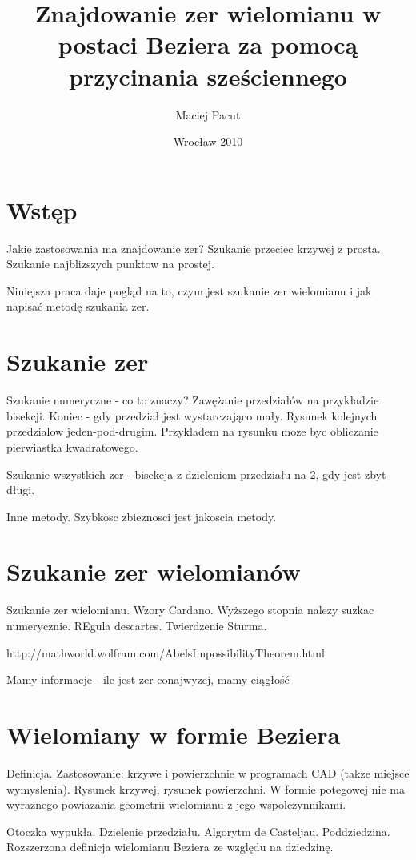 \documentclass[11pt,a4paper,oneside]{report}
\title{Znajdowanie zer wielomianu w postaci Beziera za pomocą przycinania sześciennego}
\author{Maciej Pacut}
\date{Wrocław 2010}
\begin{document}
\maketitle
\newpage

\section{Wstęp}

Jakie zastosowania ma znajdowanie zer? Szukanie przeciec krzywej z prosta. Szukanie najblizszych punktow na prostej.

Niniejsza praca daje pogląd na to, czym jest szukanie zer wielomianu i jak napisać metodę szukania zer.

\section{Szukanie zer}


Szukanie numeryczne - co to znaczy? Zawężanie przedziałów na przykładzie bisekcji. Koniec - gdy przedział jest wystarczająco mały. Rysunek kolejnych przedzialow jeden-pod-drugim. Przykladem na rysunku moze byc obliczanie pierwiastka kwadratowego.

Szukanie wszystkich zer - bisekcja z dzieleniem przedziału na 2, gdy jest zbyt długi.

Inne metody. Szybkosc zbieznosci jest jakoscia metody. 

\section{Szukanie zer wielomianów}

Szukanie zer wielomianu. Wzory Cardano. Wyższego stopnia nalezy suzkac numerycznie. REgula descartes. Twierdzenie Sturma.

http://mathworld.wolfram.com/AbelsImpossibilityTheorem.html

 Mamy informacje - ile jest zer conajwyzej, mamy ciągłość

\section{Wielomiany w formie Beziera}

Definicja. Zastosowanie: krzywe i powierzchnie w programach CAD (takze miejsce wymyslenia). Rysunek krzywej, rysunek powierzchni. W formie potegowej nie ma wyraznego powiazania geometrii wielomianu z jego wspolczynnikami. 

Otoczka wypukła. Dzielenie przedziału. Algorytm de Casteljau. Poddziedzina. Rozszerzona definicja wielomianu Beziera ze względu na dziedzinę.
\end{document}
